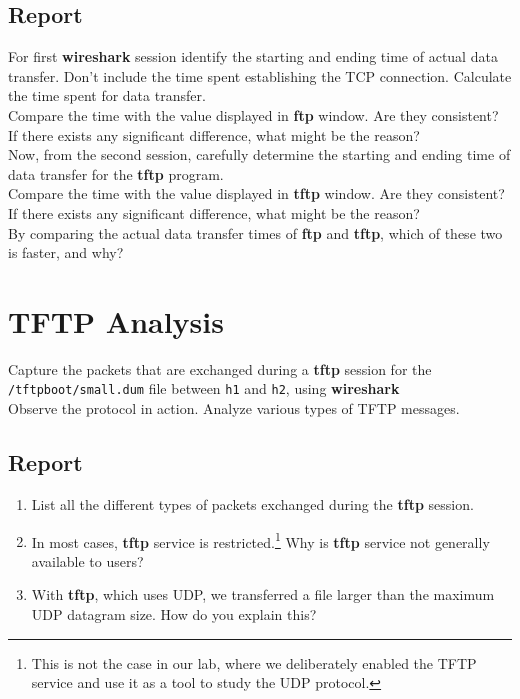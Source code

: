 \documentclass[10pt,a4paper]{article}
\numberwithin{equation}{section}
\numberwithin{figure}{section}
\numberwithin{table}{section}
\begin{document}
\subsection*{Report}
For first \textbf{wireshark} session identify the starting and ending time of actual data transfer.
Don’t include the time spent establishing the TCP connection.
Calculate the time spent for data transfer. \\
Compare the time with the value displayed in \textbf{ftp} window.
Are they consistent?
If there exists any significant difference, what might be the reason? \\
Now, from the second session, carefully determine the starting and ending time of data transfer for the \textbf{tftp} program. \\
Compare the time with the value displayed in \textbf{tftp} window.
Are they consistent?
If there exists any significant difference, what might be the reason? \\
By comparing the actual data transfer times of \textbf{ftp} and \textbf{tftp}, which of these two is faster, and why?

\section{TFTP Analysis}
Capture the packets that are exchanged during a \textbf{tftp} session for the \linebreak \texttt{/tftpboot/small.dum} file between \texttt{h1} and \texttt{h2}, using \textbf{wireshark} \\
Observe the protocol in action.
Analyze various types of TFTP messages.
\subsection*{Report}
\begin{enumerate}
	\item List all the different types of packets exchanged during the \textbf{tftp} session.
	\item In most cases, \textbf{tftp} service is restricted.\footnote{This is not the case in our lab, where we deliberately enabled the TFTP service and use it as a tool to study the UDP protocol.}
	Why is \textbf{tftp} service not generally available to users?
	\item With \textbf{tftp}, which uses UDP, we transferred a file larger than the maximum UDP datagram size.
	How do you explain this?
\end{enumerate}
\end{document}
